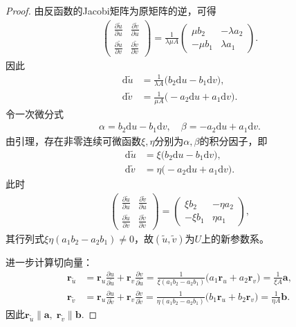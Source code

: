 \documentclass[../../main.tex]{subfiles}%
\begin{document}
\begin{proof}
由反函数的Jacobi矩阵为原矩阵的逆，可得
\begin{align}
\begin{pmatrix}
\frac{\partial\tilde u}{\partial u}&\frac{\partial\tilde v}{\partial u}\\
\frac{\partial\tilde u}{\partial v}&\frac{\partial\tilde v}{\partial v}
\end{pmatrix}
=\frac{1}{\lambda\mu A}\begin{pmatrix}
\mu b_2&-\lambda a_2\\
-\mu b_1&\lambda a_1
\end{pmatrix}.
\label{eq:jacobiinv}
\end{align}
因此
\begin{align}
\mathrm{d}\tilde u&=\frac{1}{\lambda A}\big(b_2\mathrm{d}u - b_1\mathrm{d}v\big),\nonumber\\
\mathrm{d}\tilde v&=\frac{1}{\mu A}\big(-a_2\mathrm{d}u + a_1\mathrm{d}v\big).
\label{eq:diffformtildeuv}
\end{align}
令一次微分式
\begin{align*}
\alpha = b_2\mathrm{d}u - b_1\mathrm{d}v,\quad \beta = -a_2\mathrm{d}u + a_1\mathrm{d}v.
\end{align*}
由引理，存在非零连续可微函数$\xi,\eta$分别为$\alpha,\beta$的积分因子，即
\begin{align}
\mathrm{d}\tilde u &= \xi\big(b_2\mathrm{d}u - b_1\mathrm{d}v\big),\nonumber\\
\mathrm{d}\tilde v &= \eta\big(-a_2\mathrm{d}u + a_1\mathrm{d}v\big).
\label{eq:intfactordiff}
\end{align}
此时
\begin{align*}
\begin{pmatrix}
\frac{\partial\tilde u}{\partial u}&\frac{\partial\tilde v}{\partial u}\\
\frac{\partial\tilde u}{\partial v}&\frac{\partial\tilde v}{\partial v}
\end{pmatrix}
=\begin{pmatrix}
\xi b_2&-\eta a_2\\
-\xi b_1&\eta a_1
\end{pmatrix},
\end{align*}
其行列式$\xi\eta(a_1b_2-a_2b_1)\neq0$，故$(\tilde u,\tilde v)$为$U$上的新参数系。

进一步计算切向量：
\begin{align*}
\bm r_{\tilde u}&=\bm r_u\frac{\partial u}{\partial\tilde u}+\bm r_v\frac{\partial v}{\partial\tilde u}
=\frac{1}{\xi(a_1b_2-a_2b_1)}\big(a_1\bm r_u+a_2\bm r_v\big)
=\frac{1}{\xi A}\bm a,\\
\bm r_{\tilde v}&=\bm r_u\frac{\partial u}{\partial\tilde v}+\bm r_v\frac{\partial v}{\partial\tilde v}
=\frac{1}{\eta(a_1b_2-a_2b_1)}\big(b_1\bm r_u+b_2\bm r_v\big)
=\frac{1}{\eta A}\bm b.
\end{align*}
因此$\bm r_{\tilde u}\parallel\bm a,\;\bm r_{\tilde v}\parallel\bm b$.
\end{proof}
\end{document}
